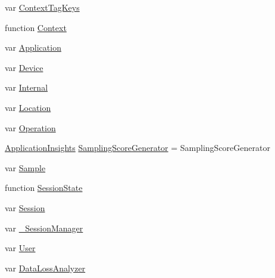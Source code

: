 \begin{DoxyCompactItemize}
var \hyperlink{obj_2_release_2_package_2_package_tmp_2_scripts_2ai_80_822_89-build00167_8js_a72ddf7ed435bb5a0f2826ad1a1f57735}{Context\+Tag\+Keys}
\item 
function \hyperlink{obj_2_release_2_package_2_package_tmp_2_scripts_2ai_80_822_89-build00167_8js_ad29165c33cb3391580723883490cde09}{Context}
\item 
var \hyperlink{obj_2_release_2_package_2_package_tmp_2_scripts_2ai_80_822_89-build00167_8js_ad06be159591b6802b5db7e36265c7ed5}{Application}
\item 
var \hyperlink{obj_2_release_2_package_2_package_tmp_2_scripts_2ai_80_822_89-build00167_8js_a8a8c87708717f319fc6104f268130638}{Device}
\item 
var \hyperlink{obj_2_release_2_package_2_package_tmp_2_scripts_2ai_80_822_89-build00167_8js_a259cf48ccc03a91135eacb5dbc0cf8b6}{Internal}
\item 
var \hyperlink{obj_2_release_2_package_2_package_tmp_2_scripts_2ai_80_822_89-build00167_8js_a107c5219a275c2c75548b48049eb29d7}{Location}
\item 
var \hyperlink{obj_2_release_2_package_2_package_tmp_2_scripts_2ai_80_822_89-build00167_8js_a53ec7a54b2849bab2d97eca342a7bb17}{Operation}
\item 
\hyperlink{_scripts_2ai_80_822_89-build00167_8js_aa415ef4f8cdd699689ef4b61db7656d8}{Application\+Insights} \hyperlink{obj_2_release_2_package_2_package_tmp_2_scripts_2ai_80_822_89-build00167_8js_a16fa020411e8bfe1c0655b09a399e6cf}{Sampling\+Score\+Generator} = Sampling\+Score\+Generator
\item 
var \hyperlink{obj_2_release_2_package_2_package_tmp_2_scripts_2ai_80_822_89-build00167_8js_ac4c96e06e96de046ca267f77e98c2cf6}{Sample}
\item 
function \hyperlink{obj_2_release_2_package_2_package_tmp_2_scripts_2ai_80_822_89-build00167_8js_aed1bddab8f824e41b716e38a2998ff37}{Session\+State}
\item 
var \hyperlink{obj_2_release_2_package_2_package_tmp_2_scripts_2ai_80_822_89-build00167_8js_adde58525426df76d5d4edaa9c8090a38}{Session}
\item 
var \hyperlink{obj_2_release_2_package_2_package_tmp_2_scripts_2ai_80_822_89-build00167_8js_ae635f688b4bd69298d993ba9db3c30b2}{\+\_\+\+Session\+Manager}
\item 
var \hyperlink{obj_2_release_2_package_2_package_tmp_2_scripts_2ai_80_822_89-build00167_8js_a0bf83e41ae2819a20c5b1651d6e492ca}{User}
\item 
var \hyperlink{obj_2_release_2_package_2_package_tmp_2_scripts_2ai_80_822_89-build00167_8js_a9d4d6587cb1e491c440b1bf2e59d8cf6}{Data\+Loss\+Analyzer}

\end{DoxyCompactItemize}
